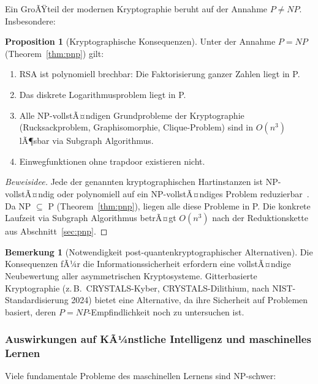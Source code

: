 ﻿\documentclass[a4paper,12pt]{article}
\theoremstyle{definition}
\newtheorem{bemerkung}{Bemerkung}[section]
\newtheorem{proposition}{Proposition}[section]
\begin{document}
Ein GroÃŸteil der modernen Kryptographie beruht auf der Annahme $P \neq NP$.
Insbesondere:

\begin{proposition}[Kryptographische Konsequenzen]
\label{prop:krypto}
Unter der Annahme $P = NP$ (Theorem~\ref{thm:pnp}) gilt:
\begin{enumerate}
    \item RSA ist polynomiell brechbar: Die Faktorisierung ganzer Zahlen liegt in P.
    \item Das diskrete Logarithmusproblem liegt in P.
    \item Alle NP-vollstÃ¤ndigen Grundprobleme der Kryptographie (Rucksackproblem,
          Graphisomorphie, Clique-Problem) sind in $O(n^3)$ lÃ¶sbar via Subgraph Algorithmus.
    \item Einwegfunktionen ohne trapdoor existieren nicht.
\end{enumerate}
\end{proposition}

\begin{proof}[Beweisidee]
Jede der genannten kryptographischen Hartinstanzen ist NP-vollstÃ¤ndig oder
polynomiell auf ein NP-vollstÃ¤ndiges Problem reduzierbar~\cite{garey1979}.
Da NP $\subseteq$ P (Theorem~\ref{thm:pnp}), liegen alle diese Probleme in P.
Die konkrete Laufzeit via Subgraph Algorithmus betrÃ¤gt $O(n^3)$ nach der
Reduktionskette aus Abschnitt~\ref{sec:pnp}.
\end{proof}

\begin{bemerkung}[Notwendigkeit post-quantenkryptographischer Alternativen]
Die Konsequenzen fÃ¼r die Informationssicherheit erfordern eine vollstÃ¤ndige
Neubewertung aller asymmetrischen Kryptosysteme. Gitterbasierte Kryptographie
(z.\,B.\ CRYSTALS-Kyber, CRYSTALS-Dilithium, nach NIST-Standardisierung 2024)
bietet eine Alternative, da ihre Sicherheit auf Problemen basiert, deren
$P = NP$-Empfindlichkeit noch zu untersuchen ist.
\end{bemerkung}

\subsubsection{Auswirkungen auf KÃ¼nstliche Intelligenz und maschinelles Lernen}

Viele fundamentale Probleme des maschinellen Lernens sind NP-schwer:
\end{document}
